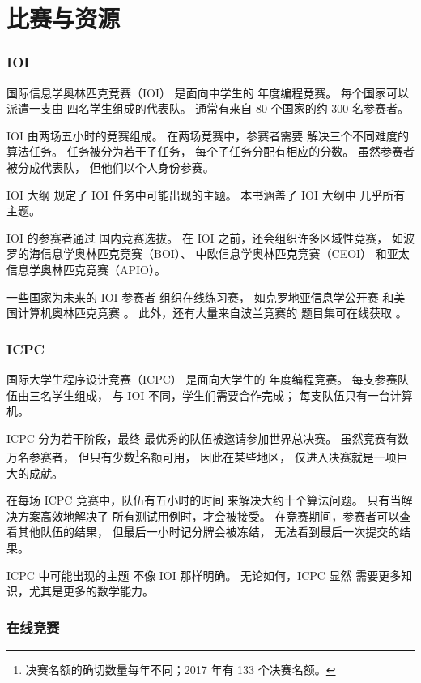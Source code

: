 \section{比赛与资源}

\subsubsection{IOI}

国际信息学奥林匹克竞赛（IOI）
是面向中学生的
年度编程竞赛。
每个国家可以派遣一支由
四名学生组成的代表队。
通常有来自
80 个国家的约 300 名参赛者。

IOI 由两场五小时的竞赛组成。
在两场竞赛中，参赛者需要
解决三个不同难度的算法任务。
任务被分为若干子任务，
每个子任务分配有相应的分数。
虽然参赛者被分成代表队，
但他们以个人身份参赛。

IOI 大纲 \cite{iois} 规定了
IOI 任务中可能出现的主题。
本书涵盖了 IOI 大纲中
几乎所有主题。

IOI 的参赛者通过
国内竞赛选拔。
在 IOI 之前，还会组织许多区域性竞赛，
如波罗的海信息学奥林匹克竞赛（BOI）、
中欧信息学奥林匹克竞赛（CEOI）
和亚太信息学奥林匹克竞赛（APIO）。

一些国家为未来的 IOI 参赛者
组织在线练习赛，
如克罗地亚信息学公开赛 \cite{coci}
和美国计算机奥林匹克竞赛 \cite{usaco}。
此外，还有大量来自波兰竞赛的
题目集可在线获取 \cite{main}。

\subsubsection{ICPC}

国际大学生程序设计竞赛（ICPC）
是面向大学生的
年度编程竞赛。
每支参赛队伍由三名学生组成，
与 IOI 不同，学生们需要合作完成；
每支队伍只有一台计算机。

ICPC 分为若干阶段，最终
最优秀的队伍被邀请参加世界总决赛。
虽然竞赛有数万名参赛者，
但只有少数\footnote{决赛名额的确切数量每年不同；2017 年有 133 个决赛名额。}名额可用，
因此在某些地区，
仅进入决赛就是一项巨大的成就。

在每场 ICPC 竞赛中，队伍有五小时的时间
来解决大约十个算法问题。
只有当解决方案高效地解决了
所有测试用例时，才会被接受。
在竞赛期间，参赛者可以查看其他队伍的结果，
但最后一小时记分牌会被冻结，
无法看到最后一次提交的结果。

ICPC 中可能出现的主题
不像 IOI 那样明确。
无论如何，ICPC 显然
需要更多知识，尤其是更多的数学能力。

\subsubsection{在线竞赛}

